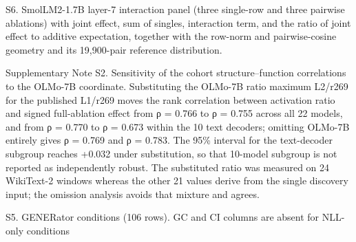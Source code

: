 \documentclass[11pt]{article}
\begin{document}
S6. SmolLM2-1.7B layer-7 interaction panel (three single-row and three pairwise ablations) with joint effect, sum of singles, interaction term, and the ratio of joint effect to additive expectation, together with the row-norm and pairwise-cosine geometry and its 19,900-pair reference distribution.

Supplementary Note S2. Sensitivity of the cohort structure–function correlations to the OLMo-7B coordinate. Substituting the OLMo-7B ratio maximum L2/r269 for the published L1/r269 moves the rank correlation between activation ratio and signed full-ablation effect from ρ = 0.766 to ρ = 0.755 across all 22 models, and from ρ = 0.770 to ρ = 0.673 within the 10 text decoders; omitting OLMo-7B entirely gives ρ = 0.769 and ρ = 0.783. The 95\% interval for the text-decoder subgroup reaches +0.032 under substitution, so that 10-model subgroup is not reported as independently robust. The substituted ratio was measured on 24 WikiText-2 windows whereas the other 21 values derive from the single discovery input; the omission analysis avoids that mixture and agrees.

S5. GENERator conditions (106 rows). GC and CI columns are absent for NLL-only conditions
\end{document}
